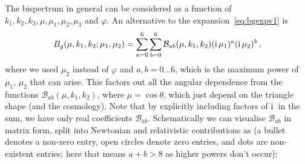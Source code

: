 The bispectrum in general can be considered as a function of
$k_1,k_2,k_3,\mu,\mu_1, \mu_2, \mu_3$ and $\varphi$. An alternative to the expansion~\eqref{eq:bgexpv1} is 
\begin{equation}\label{eq:bg_absum_reln}
B_g (\mu,k_1,k_2;\mu_1,\mu_2)= \sum_{a=0}^6\sum_{b=0}^6 \mathcal{B}_{ab}(\mu, k_1, k_2)  (\mathrm{i\,}\mu_1)^a(\mathrm{i\,}\mu_2)^b\,,
\end{equation}
where we used $\mu_2$ instead of $\varphi$ and $a,b=0\ldots6$, which is the maximum power of $\mu_1,\,\mu_2$ that can arise. This factors out all the angular dependence from the functions $\mathcal{B}_{ab}(\mu,k_1,k_2)$, where $\mu=\cos\theta$, which just depend on the triangle shape (and the cosmology). Note that by explicitly including factors of $\mathrm{i\,}$ in the sum, we have only real coefficients $\mathcal{B}_{ab}$. 
Schematically we can visualise $\mathcal{B}_{ab}$ in matrix form, split into Newtonian and relativistic contributions as (a bullet denotes a non-zero entry, open circles denote zero entries, and dots are non-existent entries; here that means $a+b > 8$ as higher powers don't occur):
